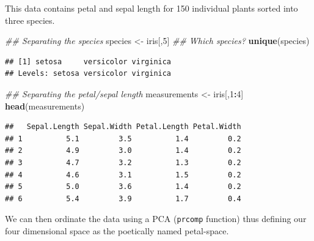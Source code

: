 \documentclass[
]{book}
\newenvironment{Shaded}{\begin{snugshade}}{\end{snugshade}}
\newcommand{\CommentTok}[1]{\textcolor[rgb]{0.56,0.35,0.01}{\textit{#1}}}
\newcommand{\DecValTok}[1]{\textcolor[rgb]{0.00,0.00,0.81}{#1}}
\newcommand{\KeywordTok}[1]{\textcolor[rgb]{0.13,0.29,0.53}{\textbf{#1}}}
\newcommand{\NormalTok}[1]{#1}
\newcommand{\OperatorTok}[1]{\textcolor[rgb]{0.81,0.36,0.00}{\textbf{#1}}}
\newcommand{\StringTok}[1]{\textcolor[rgb]{0.31,0.60,0.02}{#1}}
\begin{document}
This data contains petal and sepal length for 150 individual plants sorted into three species.

\begin{Shaded}
\begin{Highlighting}[]
\CommentTok{\#\# Separating the species}
\NormalTok{species \textless{}{-}}\StringTok{ }\NormalTok{iris[,}\DecValTok{5}\NormalTok{]}
\CommentTok{\#\# Which species?}
\KeywordTok{unique}\NormalTok{(species)}
\end{Highlighting}
\end{Shaded}

\begin{verbatim}
## [1] setosa     versicolor virginica 
## Levels: setosa versicolor virginica
\end{verbatim}

\begin{Shaded}
\begin{Highlighting}[]
\CommentTok{\#\# Separating the petal/sepal length}
\NormalTok{measurements \textless{}{-}}\StringTok{ }\NormalTok{iris[,}\DecValTok{1}\OperatorTok{:}\DecValTok{4}\NormalTok{]}
\KeywordTok{head}\NormalTok{(measurements)}
\end{Highlighting}
\end{Shaded}

\begin{verbatim}
##   Sepal.Length Sepal.Width Petal.Length Petal.Width
## 1          5.1         3.5          1.4         0.2
## 2          4.9         3.0          1.4         0.2
## 3          4.7         3.2          1.3         0.2
## 4          4.6         3.1          1.5         0.2
## 5          5.0         3.6          1.4         0.2
## 6          5.4         3.9          1.7         0.4
\end{verbatim}

We can then ordinate the data using a PCA (\texttt{prcomp} function) thus defining our four dimensional space as the poetically named petal-space.

\begin{Shaded}
\end{Shaded}
\end{document}

